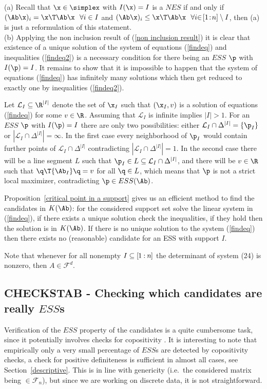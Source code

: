 \documentclass[moor]{informs3}              %
\def\irg#1#2{{ \in\! [{#1}\! : \! {#2}]}}
\def\rg#1#2{{ [\kern-.5pt{#1}\kern-.5pt : \kern-.5pt {#2}\kern-.5pt]}}
\def\cowe#1{{#1}} %
\begin{document}
\bep
(a) Recall that $\x \in \simplex$ with $I(\x)=I$ is a $NES$ if and only if $(\Ab\x)_i=\x \T \Ab \x \ \ \forall i \in I$ and $(\Ab\x)_i \leq \x\T \Ab \x \ \ \forall i \irg 1n\setminus I$, then (a) is just a reformulation of this statement.\\
(b) Applying the non inclusion result of  (\ref{non inclusion result}) it is clear that existence of a unique solution of the system of equations (\ref{findeq}) and inequalities (\ref{findeq2}) is a necessary condition for there being an $ESS$ $\p$ with $I(\p)=I$. It remains to show that it is impossible to happen that the system of equations (\ref{findeq}) has infinitely many solutions which then get reduced to exactly one by inequalities (\ref{findeq2}).

\cowe{Let $\mathcal{L}_I\subseteq\R^{|I|}$ denote the set of $\x_I$ such that $(\x_I,v)$ is a solution of equations (\ref{findeq}) for some $v\in\R$. Assuming that $\mathcal{L}_I$ is infinite implies $|I|>1$. For} an $ESS$ $\p$ with $I(\p)=I$ there are only two possibilities: either $\mathcal{L}_I\cap\cowe{\Delta^{|I|}}=\{\cowe{\p_I}\}$ or $|\mathcal{L}_I\cap\cowe{\Delta^{|I|}}|=\infty$.
In the first case every neighborhood of $\cowe{\p_I}$ would contain further points of $\mathcal{L}_I\cap\cowe{\Delta^{|I|}}$ contradicting $|\mathcal{L}_I\cap\cowe{\Delta^{|I|}}|=1$. In the second case there will be a line segment $L$ such that $\cowe{\p_I}\in L\subseteq\mathcal{L}_I\cap\cowe{\Delta^{|I|}}$, and there will be $v\in\R$ such that $\q\T\cowe{\Ab_I}\q=v$ for all $\q\in L$,
which means that $\p$ is not a strict local maximizer, contradicting $\p\in ESS(\Ab)$.
\ep

Proposition~\ref{critical point in a support} gives us an efficient method to find the candidates in $K(\Ab)$: for the considered support set solve the linear system in (\ref{findeq}), if there exists a unique solution check the inequalities, if they hold then the solution is in $K(\Ab)$. If there is no unique solution to the system (\ref{findeq}) then there exists no (reasonable) candidate for an ESS with support $I$.

Note that whenever for all nonempty $I\subseteq \rg 1n$  the determinant of system (24) is nonzero, then $A \in {\mathcal F}^d$.

\subsection*{CHECKSTAB - Checking which candidates are really $ESS$s}
\label{stability selection}
Verification of the $ESS$ property of the candidates is a quite cumbersome task, since it potentially involves checks for copositivity \cite[Section 3]{Bomz92a}. It is interesting to note that empirically only a very small percentage of $ESS$s are detected by copositivity checks, a check for positive definiteness is sufficient in almost all cases, see Section~\ref{descriptive}. This is in line with genericity (i.e.\ the considered matrix being $\in \mathcal{F}_n $), but since we are working on discrete data, it is not straightforward.
\end{document}
